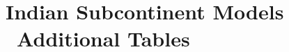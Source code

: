 \chapter{\label{app:isc-results-tables}Indian Subcontinent Models \textemdash\ Additional Tables}




